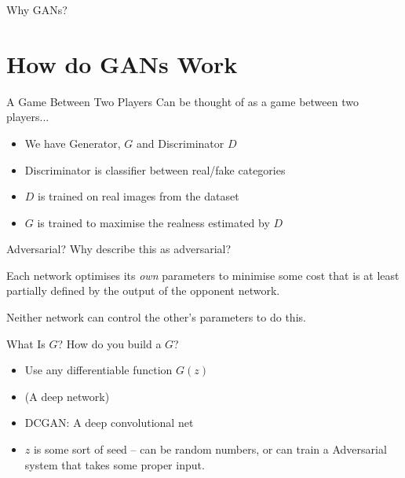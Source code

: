 \documentclass[10pt]{beamer}
\begin{document}
\begin{frame}{Why GANs?}
    
\end{frame}{}

\section{How do GANs Work}

\begin{frame}{A Game Between Two Players}
Can be thought of as a game between two players...
\begin{itemize}
    \item We have Generator, $G$ and Discriminator $D$
    \item Discriminator is classifier between real/fake categories
    \item $D$ is trained on real images from the dataset
    \item $G$ is trained to maximise the realness estimated by $D$
\end{itemize}{}
    
\end{frame}

\begin{frame}{Adversarial?}
Why describe this as adversarial?

Each network optimises its \emph{own} parameters to minimise some cost that is at least partially defined by the output of the opponent network.    

Neither network can control the other's parameters to do this.

\end{frame}

\begin{frame}{What Is $G$?}
    How do you build a $G$?
    \begin{itemize}
        \item Use any differentiable function $G(z)$
        \item (A deep network)
        \item DCGAN: A deep convolutional net
        \item $z$ is some sort of seed -- can be random numbers, or can train a Adversarial system that takes some proper input.
    \end{itemize}{}
\end{frame}{}
\end{document}
